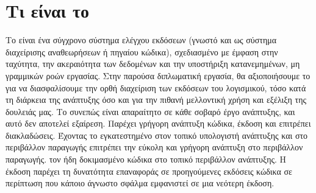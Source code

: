 \section{Τι είναι το  }
Το  είναι ένα σύγχρονο σύστημα ελέγχου εκδόσεων (γνωστό και ως σύστημα διαχείρισης αναθεωρήσεων ή πηγαίου κώδικα), 
σχεδιασμένο με έμφαση στην ταχύτητα, την ακεραιότητα των δεδομένων και την υποστήριξη κατανεμημένων, μη γραμμικών ροών εργασίας. 
Στην παρούσα διπλωματική εργασία, θα αξιοποιήσουμε το  για να διασφαλίσουμε την ορθή διαχείριση των εκδόσεων του λογισμικού, 
τόσο κατά τη διάρκεια της ανάπτυξης όσο και για την πιθανή μελλοντική χρήση και εξέλιξη της δουλειάς μας. Το  συνεπώς είναι απαραίτητο σε κάθε σοβαρό 
έργο ανάπτυξης, και αυτό δεν αποτελεί εξαίρεση. Παρέχει γρήγορη ανάπτυξη κώδικα, έκδοση και επιτρέπει διακλαδώσεις. Έχοντας το εγκατεστημένο στον 
τοπικό υπολογιστή ανάπτυξης και στο περιβάλλον παραγωγής επιτρέπει την εύκολη και γρήγορη ανάπτυξη στο περιβάλλον παραγωγής.
τον ήδη δοκιμασμένο κώδικα στο τοπικό περιβάλλον ανάπτυξης. Η έκδοση παρέχει τη δυνατότητα επαναφοράς σε προηγούμενες εκδόσεις κώδικα σε
περίπτωση που κάποιο άγνωστο σφάλμα εμφανιστεί σε μια νεότερη έκδοση. 






